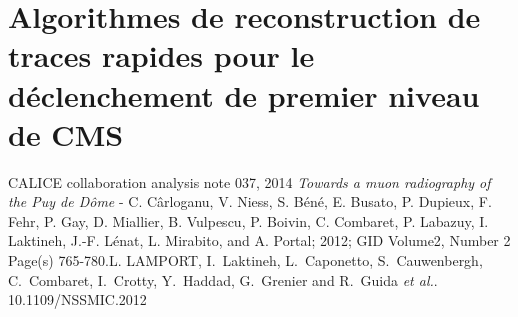 \documentclass[9pt,french]{article}
\begin{document}
\section*{Algorithmes de reconstruction de traces rapides pour le d\'eclenchement de premier niveau de CMS} 

\begin{thebibliography}{2}
    CALICE collaboration analysis note 037, 2014 
    {\it Towards a muon radiography of the Puy de Dôme} - C. Cârloganu, V. Niess, S. Béné, E. Busato, P. Dupieux, F. Fehr, P. Gay, D. Miallier, B. Vulpescu, P. Boivin, C. Combaret, P. Labazuy, I. Laktineh, J.-F. Lénat, L. Mirabito, and A. Portal; 2012; GID Volume2, Number 2 Page(s) 765-780.L. LAMPORT, 
  I.~Laktineh, L.~Caponetto, S.~Cauwenbergh, C.~Combaret, I.~Crotty, Y.~Haddad, G.~Grenier and R.~Guida {\it et al.}. 10.1109/NSSMIC.2012

\end{thebibliography}
\end{document}
